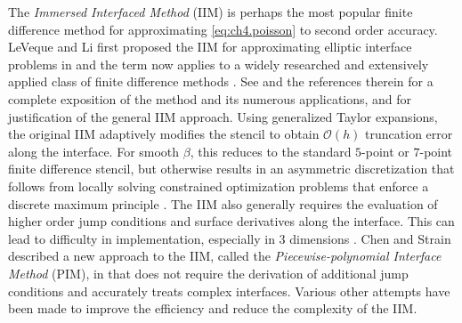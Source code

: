 The \emph{Immersed Interfaced Method} (IIM) is perhaps the most popular finite difference method for approximating \eqref{eq:ch4.poisson} to second order accuracy. LeVeque and Li first proposed the IIM for approximating elliptic interface problems in \cite{Leveque94} and the term now applies to a widely researched and extensively applied class of finite difference methods \cite{Leveque97, Li.Zhilin01b, Lee.Long03, Le.DV06, Xu.Sheng06, Tan.Zhijun08, Xu.Sheng08}. See \cite{Li.Zhilin06a} and the references therein for a complete exposition of the method and its numerous applications, and \cite{Beale06} for justification of the general IIM approach. Using generalized Taylor expansions, the original IIM adaptively modifies the stencil to obtain $\mathcal{O}(h)$ truncation error along the interface. For smooth $\beta$, this reduces to the standard $5$-point or $7$-point finite difference stencil, but otherwise results in an asymmetric discretization that follows from locally solving constrained optimization problems that enforce a discrete maximum principle \cite{Li.Zhilin01a}. The IIM also generally requires the evaluation of higher order jump conditions and surface derivatives along the interface. This can lead to difficulty in implementation, especially in $3$ dimensions \cite{Deng03, Li.Zhilin06a, Xu.Sheng06, Xu.Sheng08}. Chen and Strain described a new approach to the IIM, called the \emph{Piecewise-polynomial Interface Method} (PIM), in \cite{Chen.Tianbing08} that does not require the derivation of additional jump conditions and accurately treats complex interfaces. Various other attempts have been made \cite{Li.Zhilin98a, Weigmann00, Berthelsen04, Adams.Loyce02, Adams.Loyce04, Adams.Loyce05, Li.Zhilin06a} to improve the efficiency and reduce the complexity of the IIM.

